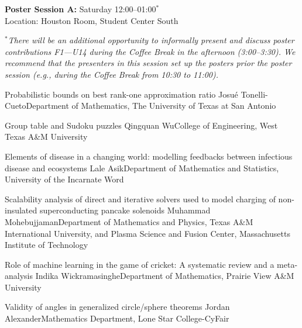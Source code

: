 
\begin{center}
{\large {\bf Poster Session A:} Saturday 12:00--01:00$^\ast$\\
Location: Houston Room, Student Center South}
\end{center}

\noindent $^\ast${\it There will be an additional opportunity to informally present and discuss poster contributions F1---U14 during the Coffee Break in the afternoon (3:00--3:30). We recommend that the presenters in this session set up the posters prior the poster session (e.g., during the Coffee Break from 10:30 to 11:00).}
\vspace{1ex}

\begin{postersPF}
\label{poster}

\item\poster %
{Probabilistic bounds on best rank-one approximation ratio}
{Josu\'e Tonelli-Cueto}{Department of Mathematics, The University of Texas at San Antonio}

\item\poster %
{Group table and Sudoku puzzles}
{Qingquan Wu}{College of Engineering, West Texas A\&M University}

\item\poster %
{Elements of disease in a changing world: modelling feedbacks between infectious disease and ecosystems}
{Lale Asik}{Department of Mathematics and Statistics, University of the Incarnate Word}

\item\poster %
{Scalability analysis of direct and iterative solvers used to model charging of non-insulated superconducting pancake solenoids}
{Muhammad Mohebujjaman}{Department of Mathematics and Physics, Texas A\&M International University, and Plasma Science and Fusion Center, Massachusetts Institute of Technology}

\item\poster %
{Role of machine learning in the game of cricket: A systematic review and a meta-analysis}
{Indika Wickramasinghe}{Department of Mathematics, Prairie View A\&M University}

\item\poster %
{Validity of angles in generalized circle/sphere theorems}
{Jordan Alexander}{Mathematics Department, Lone Star College-CyFair}


\end{postersPF}
